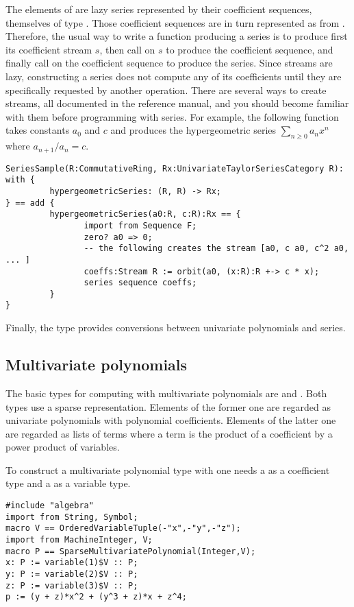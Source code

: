 The elements of  are lazy series
represented by their coefficient sequences, themselves of type
. Those coefficient sequences are in turn represented
as  from \libaldor. Therefore, the usual way to write a
function producing a series is to produce first its coefficient stream $s$,
then call  on $s$ to produce the
coefficient sequence, and finally call
 on the coefficient sequence
to produce the series. Since streams are lazy, constructing a series
does not compute any of its coefficients until they are
specifically requested by another operation. There are several ways
to create streams, all documented in the \libaldor{} reference manual,
and you should become familiar with them before programming with series.
For example, the following function takes constants
$a_0$ and $c$ and produces the hypergeometric series
$\sum_{n\ge 0} a_n x^n$ where $a_{n+1}/a_n = c$.
\begin{verbatim}
SeriesSample(R:CommutativeRing, Rx:UnivariateTaylorSeriesCategory R): with {
         hypergeometricSeries: (R, R) -> Rx;
} == add {
         hypergeometricSeries(a0:R, c:R):Rx == {
                import from Sequence F;
                zero? a0 => 0;
                -- the following creates the stream [a0, c a0, c^2 a0, ... ]
                coeffs:Stream R := orbit(a0, (x:R):R +-> c * x);
                series sequence coeffs;
         }
}
\end{verbatim}
Finally, the type  provides
conversions between univariate polynomials and series.

\subsection{Multivariate polynomials}
The basic types for computing with multivariate polynomials
are  and
.
Both types use a sparse representation.
Elements of the former one are regarded as univariate polynomials
with polynomial coefficients.
Elements of the latter one are regarded as lists of terms
where a term is the product of a coefficient by a power product
of variables.

To construct a multivariate polynomial type with 
one needs a  as  a coefficient type 
and a  as a variable type.
\begin{verbatim}
#include "algebra"
import from String, Symbol;
macro V == OrderedVariableTuple(-"x",-"y",-"z");
import from MachineInteger, V;
macro P == SparseMultivariatePolynomial(Integer,V);
x: P := variable(1)$V :: P;
y: P := variable(2)$V :: P;
z: P := variable(3)$V :: P;
p := (y + z)*x^2 + (y^3 + z)*x + z^4;
\end{verbatim}

